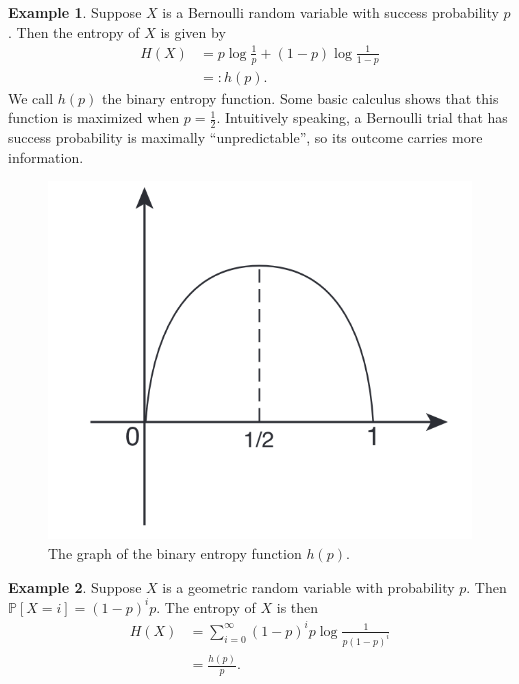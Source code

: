 \documentclass[11pt,letterpaper]{article}
\newcommand{\Prob}{\mathbb{P}}
\theoremstyle{plain}
\theoremstyle{definition}
\newtheorem{example}{Example}
\begin{document}
\begin{example}
	Suppose $X$ is a Bernoulli random variable with success probability $p$. Then the entropy of $X$ is given by
	\begin{align*}
		H(X) &= p\log \frac{1}{p} + (1-p)\log \frac{1}{1-p}\\
		&=: h(p).
	\end{align*}
	We call $h(p)$ the binary entropy function. Some basic calculus shows that this function is maximized when $p = \frac{1}{2}$. Intuitively speaking, a Bernoulli trial that has success probability is maximally ``unpredictable'', so its outcome carries more information.\\
	\begin{figure}[h]
		\centering
			\includegraphics[scale=0.4]{graph.png}
			\caption{The graph of the binary entropy function $h(p)$.}
	\end{figure}
\end{example}

\begin{example}
	Suppose $X$ is a geometric random variable with probability $p$. Then $\Prob[X = i] = (1-p)^ip$. The entropy of $X$ is then
	\begin{align*}
		H(X) &= \sum_{i=0}^\infty (1-p)^ip\log \frac{1}{p(1-p)^i}\\
		&= \frac{h(p)}{p}.
	\end{align*}
\end{example}
\end{document}
